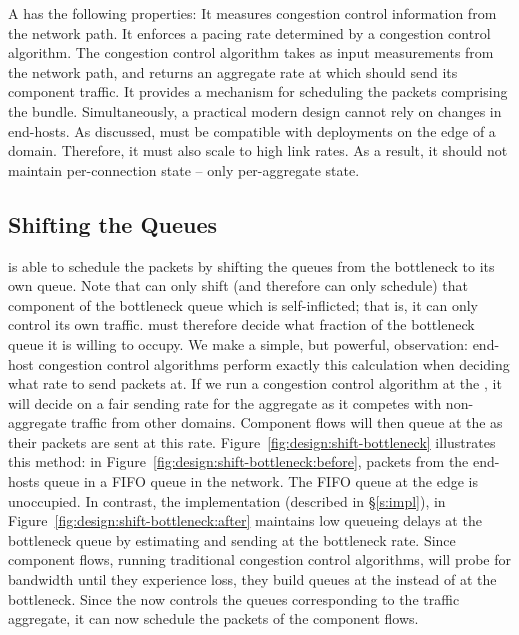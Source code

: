 \begin{outline}
\1 A \name has the following properties:
    \2 It measures congestion control information from the network path.
    \2 It enforces a pacing rate determined by a congestion control algorithm.
        \3 The congestion control algorithm takes as input measurements from the network path, and returns an aggregate rate at which \name should send its component traffic.
    \2 It provides a mechanism for scheduling the packets comprising the bundle.
\1 Simultaneously, a practical modern design cannot rely on changes in end-hosts.
\1 As discussed, \name must be compatible with deployments on the edge of a domain. Therefore, it must also scale to high link rates.
    \2 As a result, it should not maintain per-connection state -- only per-aggregate state.
\end{outline}

\subsection{Shifting the Queues}\label{s:design:shifting}
\begin{outline}
\1 \name is able to schedule the packets by shifting the queues from the bottleneck to its own queue.
\1 Note that \name can only shift (and therefore can only schedule) that component of the bottleneck queue which is self-inflicted; that is, it can only control its own traffic.
\1 \name must therefore decide what fraction of the bottleneck queue it is willing to occupy.
\1 We make a simple, but powerful, observation: end-host congestion control algorithms perform exactly this calculation when deciding what rate to send packets at.
\1 If we run a congestion control algorithm at the \name, it will decide on a fair sending rate for the aggregate as it competes with non-aggregate traffic from other domains.
\1 Component flows will then queue at the \name as their packets are sent at this rate.
\1 Figure~\ref{fig:design:shift-bottleneck} illustrates this method: 
    \2 in Figure~\ref{fig:design:shift-bottleneck:before}, packets from the end-hosts queue in a FIFO queue in the network. The FIFO queue at the edge is unoccupied.
    \2 In contrast, the \name implementation (described in \S\ref{s:impl}), in Figure~\ref{fig:design:shift-bottleneck:after} maintains low queueing delays at the bottleneck queue by estimating and sending at the bottleneck rate. 
        \3 Since component flows, running traditional congestion control algorithms, will probe for bandwidth until they experience loss, they build queues at the \name instead of at the bottleneck.
    \2 Since the \name now controls the queues corresponding to the traffic aggregate, it can now schedule the packets of the component flows.
\end{outline}

